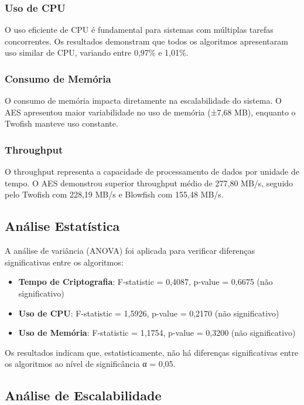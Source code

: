 \documentclass[12pt,a4paper,oneside]{article}
\begin{document}
\subsubsection{Uso de CPU}

O uso eficiente de CPU é fundamental para sistemas com múltiplas tarefas concorrentes. Os resultados demonstram que todos os algoritmos apresentaram uso similar de CPU, variando entre 0,97\% e 1,01\%.

\subsubsection{Consumo de Memória}

O consumo de memória impacta diretamente na escalabilidade do sistema. O AES apresentou maior variabilidade no uso de memória (±7,68 MB), enquanto o Twofish manteve uso constante.

\subsubsection{Throughput}

O throughput representa a capacidade de processamento de dados por unidade de tempo. O AES demonstrou superior throughput médio de 277,80 MB/s, seguido pelo Twofish com 228,19 MB/s e Blowfish com 155,48 MB/s.

\subsection{Análise Estatística}

A análise de variância (ANOVA) foi aplicada para verificar diferenças significativas entre os algoritmos:

\begin{itemize}
    \item \textbf{Tempo de Criptografia}: F-statistic = 0,4087, p-value = 0,6675 (não significativo)
    \item \textbf{Uso de CPU}: F-statistic = 1,5926, p-value = 0,2170 (não significativo)
    \item \textbf{Uso de Memória}: F-statistic = 1,1754, p-value = 0,3200 (não significativo)
\end{itemize}

Os resultados indicam que, estatisticamente, não há diferenças significativas entre os algoritmos ao nível de significância α = 0,05.

\subsection{Análise de Escalabilidade}
\end{document}
